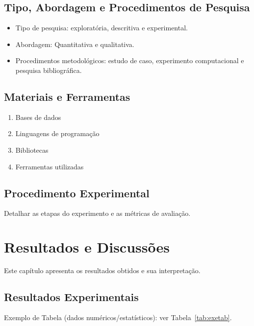 \documentclass[
	12pt,				    %
	openright,			    %
	oneside,			    %
	a4paper,			    %
    sumario=tradicional,    %
	english,			    %
	brazil,				    %
	]{abntex2}
\begin{document}
\section{Tipo, Abordagem e Procedimentos de Pesquisa}

\begin{itemize}
    \item Tipo de pesquisa: exploratória, descritiva e experimental.
    \item Abordagem: Quantitativa e qualitativa.
    \item Procedimentos metodológicos: estudo de caso, experimento computacional e pesquisa bibliográfica.
\end{itemize}

\section{Materiais e Ferramentas}

   \begin{enumerate}
       \item Bases de dados
       \item Linguagens de programação
       \item Bibliotecas
       \item Ferramentas utilizadas
   \end{enumerate}

\section{Procedimento Experimental}

Detalhar as etapas do experimento e as métricas de avaliação.

\chapter{Resultados e Discussões}\label{sec:resultados}

Este capítulo apresenta os resultados obtidos e sua interpretação.

\section{Resultados Experimentais}

Exemplo de Tabela (dados numéricos/estatísticos): ver Tabela~\ref{tab:exetab}.
\end{document}
